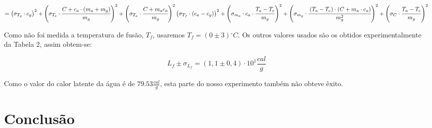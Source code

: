 \documentclass[a4paper]{article}
\begin{document}
			$=
				\left(\sigma_{T_{g}}\cdot c_{g}\right)^{2}+
				\left(\sigma_{T_{e}}\cdot\cfrac{C+c_{a}\cdot\left(m_{a}+m_{g}\right)}{m_{g}}\right)^{2}+
				\left(\sigma_{T_{a}}\cdot\cfrac{C+m_{a}c_{a}}{m_{g}}\right)^{2}
				\left(\sigma_{T_{f}}\cdot
				\left(c_{a}-c_{g}\right)\right)^{2}+
				\left(\sigma_{m_{a}}\cdot c_{a}\cdot\cfrac{T_{a}-T_{e}}{m_{g}}\right)^{2}+
				\left(\sigma_{m_{g}}\cdot\cfrac{\left(T_{a}-T_{e}\right)\cdot\left(C+m_{a}\cdot c_{a}\right)}{m_{g}^{2}}\right)^{2}+
				\left(\sigma_{C}\cdot\cfrac{T_{a}-T_{e}}{m_{g}}\right)^{2}
			$

			Como não foi medida a temperatura de fusão, $T_{f}$, usaremos $T_{f}=\left(0\pm3\right)\unit{^{\circ}C}$.
			Os outros valores usados são os obtidos experimentalmente da Tabela
			2, assim obtem-se:

			\[
				L_{f}\pm\sigma_{L_{f}}=\left(1,1\pm0,4\right)\cdot10^{1}\frac{cal}{g}
			\]


			Como o valor do calor latente da água é de $79.53\frac{cal}{g}$,
			esta parte do nosso experimento também não obteve êxito.


	\section{Conclusão}
\end{document}
